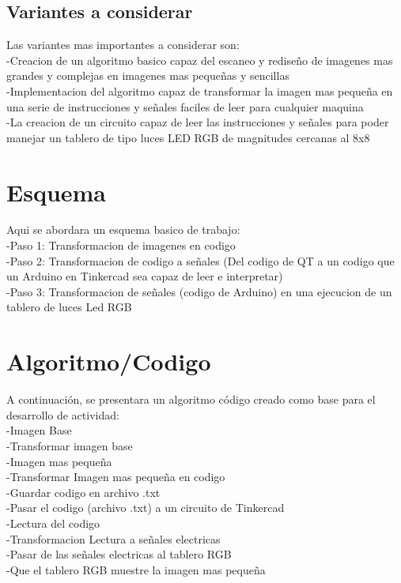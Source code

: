 \documentclass{article}
\begin{document}
\subsection{Variantes a considerar}\label{}
Las variantes mas importantes a considerar son:\\
-Creacion de un algoritmo basico capaz del escaneo y rediseño de imagenes mas grandes y complejas en imagenes mas pequeñas y sencillas\\
-Implementacion del algoritmo capaz de transformar la imagen mas pequeña en una serie de instrucciones y señales faciles de leer para cualquier maquina\\
-La creacion de un circuito capaz de leer las instrucciones y señales para poder manejar un tablero de tipo luces LED RGB de magnitudes cercanas al 8x8
\newpage
\section{Esquema} \label{contenido}
Aqui se abordara un esquema basico de trabajo: \\
-Paso 1: Transformacion de imagenes en codigo\\
-Paso 2: Transformacion de codigo a señales (Del codigo de QT a un codigo que un Arduino en Tinkercad sea capaz de leer e interpretar)\\
-Paso 3: Transformacion de señales (codigo de Arduino) en una ejecucion de un tablero de luces Led RGB
\newpage

\section{Algoritmo/Codigo} \label{algoritmo}
A continuación, se presentara un algoritmo código creado como base para el desarrollo de actividad:\\
-Imagen Base\\
-Transformar imagen base\\
\phantom{---}-Imagen mas pequeña\\
\phantom{---}-Transformar Imagen mas pequeña en codigo\\
-Guardar codigo en archivo .txt\\
-Pasar el codigo (archivo .txt) a un circuito de Tinkercad\\
-Lectura del codigo\\
-Transformacion Lectura a señales electricas\\
-Pasar de las señales electricas al tablero RGB\\
-Que el tablero RGB muestre la imagen mas pequeña\\
\end{document}
